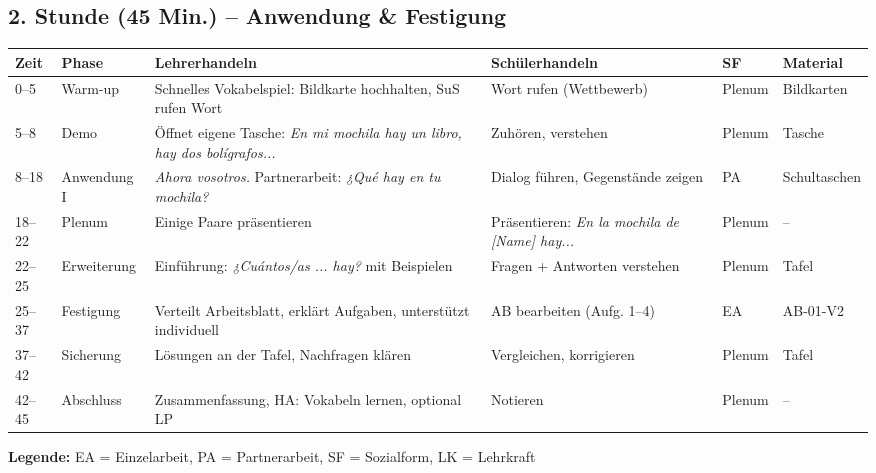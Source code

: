 \documentclass[11pt,a4paper]{article}
\begin{document}
\subsection{2. Stunde (45 Min.) -- Anwendung \& Festigung}

\begin{longtable}{|p{0.8cm}|p{1.3cm}|p{4.2cm}|p{3.2cm}|p{1.5cm}|p{1.8cm}|}
\hline
\textbf{Zeit} & \textbf{Phase} & \textbf{Lehrerhandeln} & \textbf{Schülerhandeln} & \textbf{SF} & \textbf{Material} \\
\hline
\endhead

0--5 & Warm-up & Schnelles Vokabelspiel: Bildkarte hochhalten, SuS rufen Wort & Wort rufen (Wettbewerb) & Plenum & Bildkarten \\
\hline

5--8 & Demo & Öffnet eigene Tasche: \textit{En mi mochila hay un libro, hay dos bolígrafos...} & Zuhören, verstehen & Plenum & Tasche \\
\hline

8--18 & Anwen\-dung I & \textit{Ahora vosotros.} Partnerarbeit: \textit{¿Qué hay en tu mochila?} & Dialog führen, Gegenstände zeigen & PA & Schultaschen \\
\hline

18--22 & Plenum & Einige Paare präsentieren & Präsentieren: \textit{En la mochila de [Name] hay...} & Plenum & -- \\
\hline

22--25 & Erwei\-terung & Einführung: \textit{¿Cuántos/as ... hay?} mit Beispielen & Fragen + Antworten verstehen & Plenum & Tafel \\
\hline

25--37 & Festigung & Verteilt Arbeitsblatt, erklärt Aufgaben, unterstützt individuell & AB bearbeiten (Aufg. 1--4) & EA & AB-01-V2 \\
\hline

37--42 & Sicherung & Lösungen an der Tafel, Nachfragen klären & Vergleichen, korrigieren & Plenum & Tafel \\
\hline

42--45 & Abschluss & Zusammenfassung, HA: Vokabeln lernen, optional LP & Notieren & Plenum & -- \\
\hline
\end{longtable}

\textbf{Legende:} EA = Einzelarbeit, PA = Partnerarbeit, SF = Sozialform, LK = Lehrkraft

\end{document}
